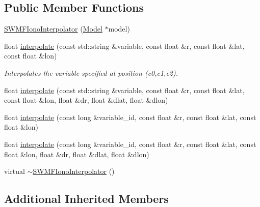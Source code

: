 \subsection*{Public Member Functions}
\begin{DoxyCompactItemize}
\item 
\hyperlink{classccmc_1_1_s_w_m_f_iono_interpolator_aafbcb9b8af05142efb18d122597c3d0a}{S\-W\-M\-F\-Iono\-Interpolator} (\hyperlink{classccmc_1_1_model}{Model} $\ast$model)
\item 
float \hyperlink{classccmc_1_1_s_w_m_f_iono_interpolator_a31727a6f4419370e5aabc9a859f360ae}{interpolate} (const std\-::string \&variable, const float \&r, const float \&lat, const float \&lon)
\begin{DoxyCompactList}\small\item\em Interpolates the variable specified at position (c0,c1,c2). \end{DoxyCompactList}\item 
float \hyperlink{classccmc_1_1_s_w_m_f_iono_interpolator_a0fd873946791fa5f9557006d7fb38a22}{interpolate} (const std\-::string \&variable, const float \&r, const float \&lat, const float \&lon, float \&dr, float \&dlat, float \&dlon)
\item 
float \hyperlink{classccmc_1_1_s_w_m_f_iono_interpolator_a8452db293bae064583ef64afe2512255}{interpolate} (const long \&variable\-\_\-id, const float \&r, const float \&lat, const float \&lon)
\item 
float \hyperlink{classccmc_1_1_s_w_m_f_iono_interpolator_a38a298ba550c771204914182d0404eba}{interpolate} (const long \&variable\-\_\-id, const float \&r, const float \&lat, const float \&lon, float \&dr, float \&dlat, float \&dlon)
\item 
virtual \hyperlink{classccmc_1_1_s_w_m_f_iono_interpolator_ae3cc2fa6f2d65330ee45aaa99a8ca2eb}{$\sim$\-S\-W\-M\-F\-Iono\-Interpolator} ()
\end{DoxyCompactItemize}
\subsection*{Additional Inherited Members}


